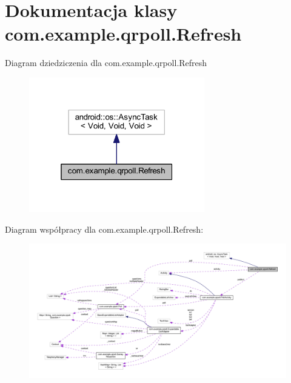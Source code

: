 \hypertarget{classcom_1_1example_1_1qrpoll_1_1_refresh}{\section{Dokumentacja klasy com.\+example.\+qrpoll.\+Refresh}
\label{classcom_1_1example_1_1qrpoll_1_1_refresh}
}


Diagram dziedziczenia dla com.\+example.\+qrpoll.\+Refresh
\nopagebreak
\begin{figure}[H]
\begin{center}
\leavevmode
\includegraphics[width=217pt]{classcom_1_1example_1_1qrpoll_1_1_refresh__inherit__graph}
\end{center}
\end{figure}


Diagram współpracy dla com.\+example.\+qrpoll.\+Refresh\+:
\nopagebreak
\begin{figure}[H]
\begin{center}
\leavevmode
\includegraphics[width=350pt]{classcom_1_1example_1_1qrpoll_1_1_refresh__coll__graph}
\end{center}
\end{figure}
